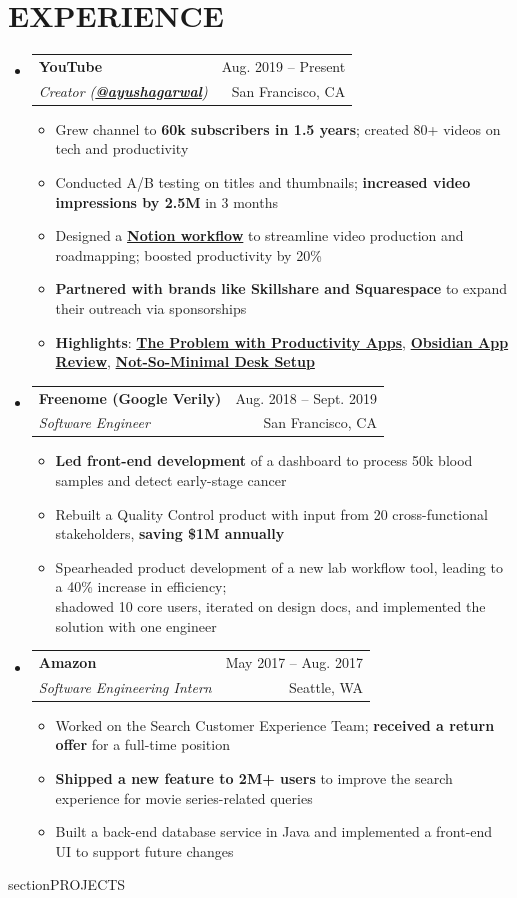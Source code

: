 \documentclass[letterpaper,11pt]{article}
\makeatletter
\newcommand{\myuline}[1]{\textbf{#1}}
\newcommand{\resumeItem}[1]{
  \item\small{
    {#1 \vspace{-1pt}}
  }
}
\newcommand{\resumeSubheading}[4]{
  \vspace{-1pt}\item
    \begin{tabular*}{\textwidth}[t]{l@{\extracolsep{\fill}}r}
      \textbf{#1} & {\color{dark-grey}\small #2}\vspace{1pt}\\ %
      \textit{#3} & {\color{dark-grey} \small #4}\\ %
    \end{tabular*}\vspace{-4pt}
}
\newcommand{\resumeSubHeadingListStart}{\begin{itemize}[leftmargin=0in, label={}]}
\newcommand{\resumeSubHeadingListEnd}{\end{itemize}}
\newcommand{\resumeItemListStart}{\begin{itemize}}
\newcommand{\resumeItemListEnd}{\end{itemize}\vspace{0pt}}
\makeatother
\begin{document}
\section{EXPERIENCE}
  \resumeSubHeadingListStart
    \resumeSubheading
      {YouTube}{Aug. 2019 -- Present}
      {Creator (\href{https://www.youtube.com/c/ayushagarwal}{\myuline {@ayushagarwal}})}{San Francisco, CA}
      \resumeItemListStart
        \resumeItem{Grew channel to \textbf{60k subscribers in 1.5 years}; created 80+ videos on tech and productivity}
        \resumeItem{Conducted A/B testing on titles and thumbnails; \textbf{increased video impressions by 2.5M} in 3 months}
         \resumeItem{Designed a {\href{https://www.notion.so/ayushagarwal/dfab8b6d935a479fa699312174fea8af?v=e64d99d35b8447aab0a749c0c790f3d7}{\myuline {Notion workflow}}} to streamline video production and roadmapping; boosted productivity by 20\%}
        \resumeItem{\textbf{Partnered with brands like Skillshare and Squarespace} to expand their outreach via sponsorships}
        \resumeItem{\textbf{Highlights}: 
            \href{https://www.youtube.com/watch?v=HhWUjp5pD0g}{\myuline {The Problem with Productivity Apps}}, \href{https://www.youtube.com/watch?v=ms4cWMsOITs}{\myuline {Obsidian App Review}},
            \href{https://www.youtube.com/watch?v=PkDbkyIR44w}{\myuline {Not-So-Minimal Desk Setup}}}
      \resumeItemListEnd
    \resumeSubheading
      {Freenome (Google Verily)}{Aug. 2018 -- Sept. 2019}
      {Software Engineer}{San Francisco, CA}
      \resumeItemListStart
        \resumeItem{\textbf{Led front-end development} of a dashboard to process 50k blood samples and detect early-stage cancer}
        \resumeItem{Rebuilt a Quality Control product with input from 20 cross-functional stakeholders, \textbf{saving \$1M annually}}
        \resumeItem{Spearheaded product development of a new lab workflow tool, leading to a 40\% increase in efficiency; \\ shadowed 10 core users, iterated on design docs, and implemented the solution with one engineer}
    \resumeItemListEnd
    \resumeSubheading
      {Amazon}{May 2017 -- Aug. 2017}
      {Software Engineering Intern}{Seattle, WA}
      \resumeItemListStart
        \resumeItem{Worked on the Search Customer Experience Team; \textbf{received a return offer} for a full-time position}
        \resumeItem{\textbf{Shipped a new feature to 2M+ users} to improve the search experience for movie series-related queries}
        \resumeItem{Built a back-end database service in Java and implemented a front-end UI to support future changes}
      \resumeItemListEnd
  \resumeSubHeadingListEnd
section{PROJECTS}
    
\end{document}
